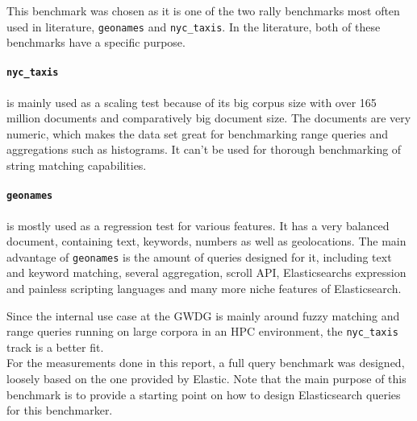 This benchmark was chosen as it is one of the two rally benchmarks most often used in literature, \texttt{geonames} and \texttt{nyc\_taxis}. In the literature, both of these benchmarks have a specific purpose. 

\paragraph{\texttt{nyc\_taxis}} is mainly used as a scaling test because of its big corpus size with over 165 million documents and comparatively big document size. The documents are very numeric, which makes the data set great for benchmarking range queries and aggregations such as histograms. It can't be used for thorough benchmarking of string matching capabilities.

\paragraph{\texttt{geonames}} is mostly used as a regression test for various features. It has a very balanced document, containing text, keywords, numbers as well as geolocations. The main advantage of \texttt{geonames} is the amount of queries designed for it, including text and keyword matching, several aggregation, scroll API, Elasticsearchs expression and painless scripting languages and many more niche features of Elasticsearch.

Since the internal use case at the GWDG is mainly around fuzzy matching and range queries running on large corpora in an \ac{HPC} environment, the \texttt{nyc\_taxis} track is a better fit.\\


For the measurements done in this report, a full query benchmark was designed, loosely based on the one provided by Elastic. Note that the main purpose of this benchmark is to provide a starting point on how to design Elasticsearch queries for this benchmarker. 

